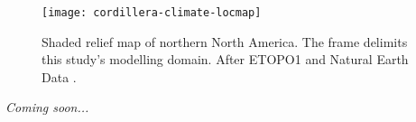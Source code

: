 
\introduction
\label{sec:intro}

\begin{figure}[t]
	\vspace*{2mm}
	\begin{center}
		\texttt{[image: cordillera-climate-locmap]}
	\end{center}
	\caption{Shaded relief map of northern North America. The frame delimits this study's modelling domain. After ETOPO1 \citep{data:etopo1} and Natural Earth Data \citep{data:naturalearth}.}
	\label{fig:locmap}
\end{figure}

\emph{Coming soon...}

